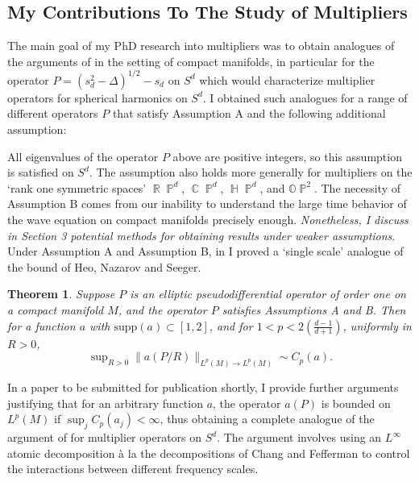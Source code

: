 \documentclass[11pt]{article}
\newtheorem*{theorem}{Theorem}
\DeclareMathOperator{\RR}{\mathbb{R}}
\DeclareMathOperator{\HH}{\mathbb{H}}
\DeclareMathOperator{\CC}{\mathbb{C}}
\DeclareMathOperator{\PP}{\mathbb{P}}
\begin{document}
\subsection{My Contributions To The Study of Multipliers} \label{ContributionMultipliers}

The main goal of my PhD research into multipliers was to obtain analogues of the arguments of \cite{HeoNazarovSeeger,Cladek,KimQuasiradial} in the setting of compact manifolds, in particular for the operator $P = (s_d^2 - \Delta)^{1/2} - s_d$ on $S^d$ which would characterize multiplier operators for spherical harmonics on $S^d$. I obtained such analogues for a range of different operators $P$ that satisfy Assumption A and the following additional assumption:
%
\begin{center}
\end{center}
%
All eigenvalues of the operator $P$ above are positive integers, so this assumption is satisfied on $S^d$. The assumption also holds more generally for multipliers on the `rank one symmetric spaces' $\RR \PP^d$, $\CC \PP^d$, $\HH \PP^d$, and $\mathbb{O} \PP^2$. The necessity of Assumption B comes from our inability to understand the large time behavior of the wave equation on compact manifolds precisely enough. \emph{Nonetheless, I discuss in Section 3 potential methods for obtaining results under weaker assumptions}. Under Assumption A and Assumption B, in \cite{DensonCharacterization} I proved a `single scale' analogue of the bound of Heo, Nazarov and Seeger.

\begin{theorem} \cite{DensonCharacterization}
	Suppose $P$ is an elliptic pseudodifferential operator of order one on a compact manifold $M$, and the operator $P$ satisfies Assumptions A and B. Then for a function $a$ with $\text{supp}(a) \subset [1,2]$, and for $1 < p < 2 ({\scriptstyle \frac{d-1}{d+1}})$, uniformly in $R > 0$,
    \[ \sup\nolimits_{R > 0} \| a(P/R) \|_{L^p(M) \to L^p(M)} \sim C_p(a). \]
\end{theorem}

\pagebreak[3]

In a paper to be submitted for publication shortly, I provide further arguments justifying that for an arbitrary function $a$, the operator $a(P)$ is bounded on $L^p(M)$ if $\sup_j C_p(a_j) < \infty$, thus obtaining a complete analogue of the argument of \cite{HeoNazarovSeeger} for multiplier operators on $S^d$. The argument involves using an $L^\infty$ atomic decomposition à la the decompositions of Chang and Fefferman \cite{ChangFefferman} to control the interactions between different frequency scales. %
\end{document}
